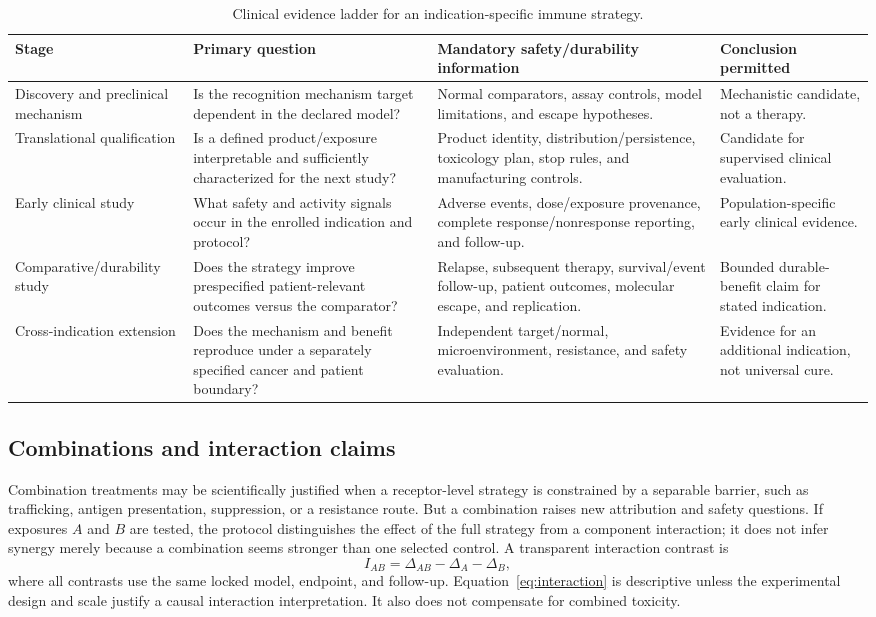 \documentclass[10pt,conference]{IEEEtran}
\begin{document}
\begin{table}[!t]\caption{Clinical evidence ladder for an indication-specific immune strategy.}\label{tab:clinical-ladder}\centering\footnotesize
\begin{tabular}{@{}p{}p{}p{}p{}@{}}\toprule
Stage & Primary question & Mandatory safety/durability information & Conclusion permitted\\\midrule
Discovery and preclinical mechanism & Is the recognition mechanism target dependent in the declared model? & Normal comparators, assay controls, model limitations, and escape hypotheses. & Mechanistic candidate, not a therapy.\\
Translational qualification & Is a defined product/exposure interpretable and sufficiently characterized for the next study? & Product identity, distribution/persistence, toxicology plan, stop rules, and manufacturing controls. & Candidate for supervised clinical evaluation.\\
Early clinical study & What safety and activity signals occur in the enrolled indication and protocol? & Adverse events, dose/exposure provenance, complete response/nonresponse reporting, and follow-up. & Population-specific early clinical evidence.\\
Comparative/durability study & Does the strategy improve prespecified patient-relevant outcomes versus the comparator? & Relapse, subsequent therapy, survival/event follow-up, patient outcomes, molecular escape, and replication. & Bounded durable-benefit claim for stated indication.\\
Cross-indication extension & Does the mechanism and benefit reproduce under a separately specified cancer and patient boundary? & Independent target/normal, microenvironment, resistance, and safety evaluation. & Evidence for an additional indication, not universal cure.\\\bottomrule\end{tabular}\end{table}

\subsection{Combinations and interaction claims}
Combination treatments may be scientifically justified when a receptor-level strategy is constrained by a separable barrier, such as trafficking, antigen presentation, suppression, or a resistance route. But a combination raises new attribution and safety questions. If exposures $A$ and $B$ are tested, the protocol distinguishes the effect of the full strategy from a component interaction; it does not infer synergy merely because a combination seems stronger than one selected control. A transparent interaction contrast is
\begin{equation}
I_{AB}=\Delta_{AB}-\Delta_A-\Delta_B,\label{eq:interaction}
\end{equation}
where all contrasts use the same locked model, endpoint, and follow-up. Equation~\eqref{eq:interaction} is descriptive unless the experimental design and scale justify a causal interaction interpretation. It also does not compensate for combined toxicity.
\end{document}
